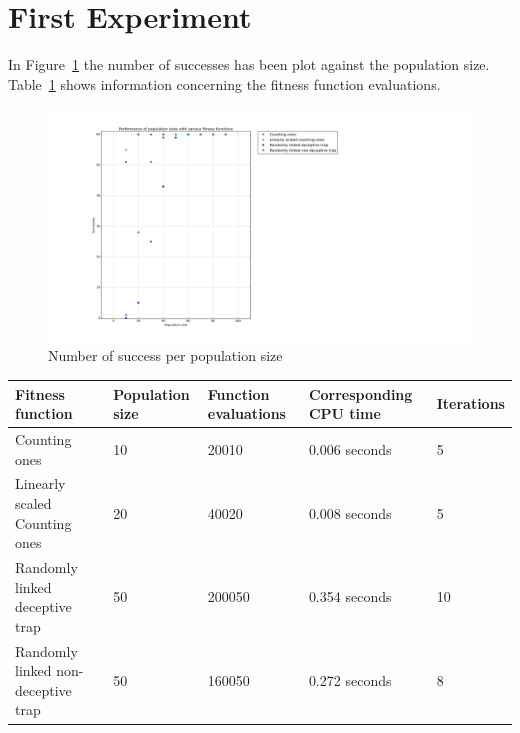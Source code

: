 \documentclass[12pt]{article}
\theoremstyle{definition}
\begin{document}
\section{First Experiment}
\label{ssec:exp1}
In Figure~\ref{fig:exp} the number of successes has been plot against the population size.
Table~\ref{tab:exp} shows information concerning the fitness function evaluations.

\begin{figure}[!htb]
    \centering
    \includegraphics[totalheight=0.7\textheight]{images/exp.png}
    \caption{Number of success per population size}
\label{fig:exp}
\end{figure}

\begin{table}[!htb]
\begin{adjustwidth}{-2cm}{}
\centering
\begin{tabular}{lp{2.5cm}p{2.5cm}p{2.8cm}p{2.5cm}}
\toprule[1.5pt]
\bf Fitness function & \bf Population size & \bf Function evaluations & \bf Corresponding CPU time& \bf Iterations\\\midrule
Counting ones & 10 & 20010 & 0.006 seconds & 5 \\
Linearly scaled Counting ones & 20 & 40020 & 0.008 seconds & 5 \\
Randomly linked deceptive trap & 50 & 200050 & 0.354 seconds & 10 \\
Randomly linked non-deceptive trap & 50 & 160050 & 0.272 seconds & 8 \\
\bottomrule[1.25pt]
\end{tabular}\par
\bigskip
{}
\label{tab:exp}
\end{adjustwidth}
\end{table}

\end{document}
